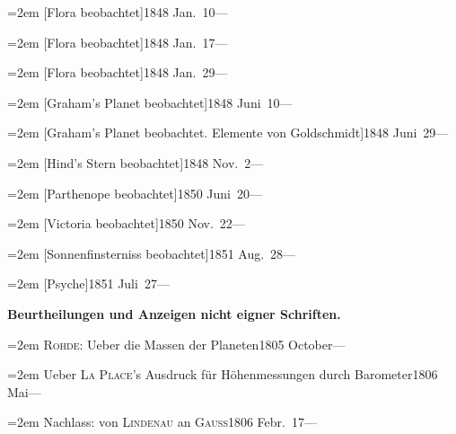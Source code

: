 \documentclass[12pt,a4paper]{article}
\begin{document}
{{{{{{{{{{{\vspace{0.5mm}
\noindent\hangindent=2em
[Flora beobachtet]\hfill 1848 Jan.\ 10\quad ---

\vspace{0.5mm}
\noindent\hangindent=2em
[Flora beobachtet]\hfill 1848 Jan.\ 17\quad ---

\vspace{0.5mm}
\noindent\hangindent=2em
[Flora beobachtet]\hfill 1848 Jan.\ 29\quad ---

\vspace{0.5mm}
\noindent\hangindent=2em
[Graham's Planet beobachtet]\hfill 1848 Juni\ 10\quad ---

\vspace{0.5mm}
\noindent\hangindent=2em
[Graham's Planet beobachtet. Elemente von Goldschmidt]\hfill 1848 Juni\ 29\quad ---

\vspace{0.5mm}
\noindent\hangindent=2em
[Hind's Stern beobachtet]\hfill 1848 Nov.\ 2\quad ---

\vspace{0.5mm}
\noindent\hangindent=2em
[Parthenope beobachtet]\hfill 1850 Juni\ 20\quad ---

\vspace{0.5mm}
\noindent\hangindent=2em
[Victoria beobachtet]\hfill 1850 Nov.\ 22\quad ---

\vspace{0.5mm}
\noindent\hangindent=2em
[Sonnenfinsterniss beobachtet]\hfill 1851 Aug.\ 28\quad ---

\vspace{0.5mm}
\noindent\hangindent=2em
[Psyche]\hfill 1851 Juli\ 27\quad ---

\vspace{2mm}
\noindent\textbf{Beurtheilungen und Anzeigen nicht eigner Schriften.}

\vspace{1mm}
\noindent\hangindent=2em
\textsc{Rohde}: Ueber die Massen der Planeten\hfill 1805 October\quad ---

\vspace{0.5mm}
\noindent\hangindent=2em
Ueber \textsc{La Place}'s Ausdruck f\"ur H\"ohenmessungen durch Barometer\hfill 1806 Mai\quad ---

\vspace{0.5mm}
\noindent\hangindent=2em
Nachlass: von \textsc{Lindenau} an \textsc{Gauss}\hfill 1806 Febr.\ 17\quad ---

}}}}}}}}}}}
\end{document}
